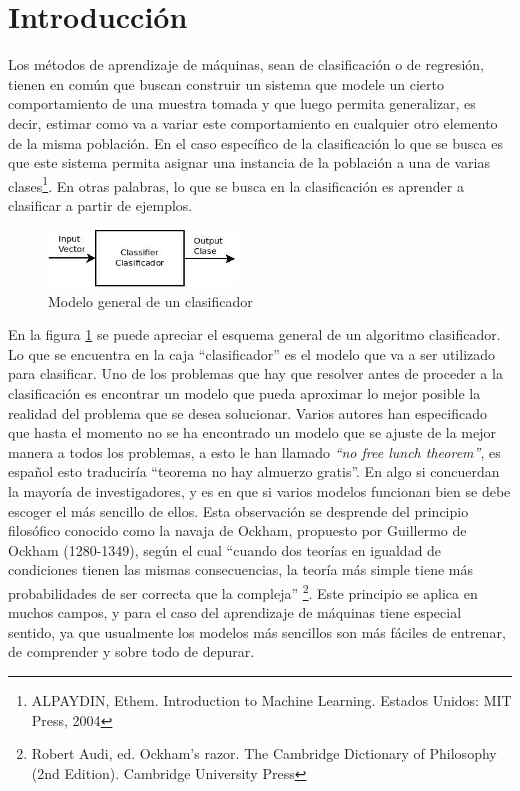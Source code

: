 \documentclass[a4paper, 11pt, oneside]{report}
\begin{document}
\section{Introducción}
Los métodos de aprendizaje de máquinas, sean de clasificación o de regresión, tienen en común que buscan construir un sistema que modele un cierto comportamiento de una muestra tomada y que luego permita generalizar, es decir, estimar como va a variar este comportamiento en cualquier otro elemento de la misma población. En el caso específico de la clasificación lo que se busca es que este sistema permita asignar una instancia de la población a una de varias clases\footnote{ALPAYDIN, Ethem. Introduction to Machine Learning. Estados Unidos: MIT Press, 2004}. En otras palabras, lo que se busca en la clasificación es aprender a clasificar a partir de ejemplos.
\begin{figure}[htb]
\begin{center}
\leavevmode
\includegraphics[width=5cm]{diagrams/classifier1.jpg}
\end{center}
\caption{Modelo general de un clasificador}
\label{fig:classif1}
\end{figure}
En la figura \ref{fig:classif1} se puede apreciar el esquema general de un algoritmo clasificador. Lo que se encuentra en la caja ``clasificador'' es el modelo que va a ser utilizado para clasificar. Uno de los problemas que hay que resolver antes de proceder a la clasificación es encontrar un modelo que pueda aproximar lo mejor posible la realidad del problema que se desea solucionar. Varios autores han especificado que hasta el momento no se ha encontrado un modelo que se ajuste de la mejor manera a todos los problemas, a esto le han llamado {\it ``no free lunch theorem''}, es español esto traduciría ``teorema no hay almuerzo gratis''. En algo si concuerdan la mayoría de investigadores, y es en que si varios modelos funcionan bien se debe escoger el más sencillo de ellos. Esta observación se desprende del principio filosófico conocido como la navaja de Ockham, propuesto por Guillermo de Ockham (1280-1349), según el cual ``cuando dos teorías en igualdad de condiciones tienen las mismas consecuencias, la teoría más simple tiene más probabilidades de ser correcta que la compleja'' \footnote{Robert Audi, ed. Ockham's razor. The Cambridge Dictionary of Philosophy (2nd Edition). Cambridge University Press}. Este principio se aplica en muchos campos, y para el caso del aprendizaje de máquinas tiene especial sentido, ya que usualmente los modelos más sencillos son más fáciles de entrenar, de comprender y sobre todo de depurar.
\end{document}
